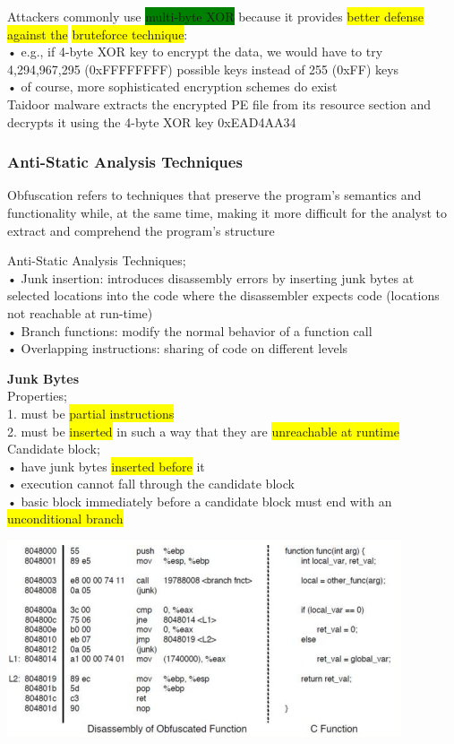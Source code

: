 \documentclass[]{project_plan}
\begin{document}
Attackers commonly use \colorbox{green}{multi-byte XOR} because it provides \colorbox{yellow}{better defense against the} \colorbox{yellow}{bruteforce technique}:\\
• e.g., if 4-byte XOR key to encrypt the data, we would have to try 4,294,967,295 (0xFFFFFFFF) possible
keys instead of 255 (0xFF) keys\\
• of course, more sophisticated encryption schemes do exist\\

Taidoor malware extracts the encrypted PE file from its resource section and decrypts it using the
4-byte XOR key 0xEAD4AA34

\subsubsection{Anti-Static Analysis Techniques}

Obfuscation refers to techniques that preserve the program’s semantics and functionality
while, at the same time, making it more difficult for the analyst to extract and comprehend
the program’s structure

Anti-Static Analysis Techniques;\\
• Junk insertion: introduces disassembly errors by inserting junk bytes at
selected locations into the code where the disassembler expects code
(locations not reachable at run-time)\\
• Branch functions: modify the normal behavior of a function call\\
• Overlapping instructions: sharing of code on different levels

\textbf{Junk Bytes}\\
Properties;\\
1. must be \colorbox{yellow}{partial instructions}\\
2. must be \colorbox{yellow}{inserted} in such a way that they are \colorbox{yellow}{unreachable at runtime}\\
Candidate block;\\
• have junk bytes \colorbox{yellow}{inserted before} it\\
• execution cannot fall through the candidate block\\
• basic block immediately before a candidate block must end with an \colorbox{yellow}{unconditional branch}

\includegraphics[width=.8\linewidth]{junk bytes eg.png}
\end{document}
